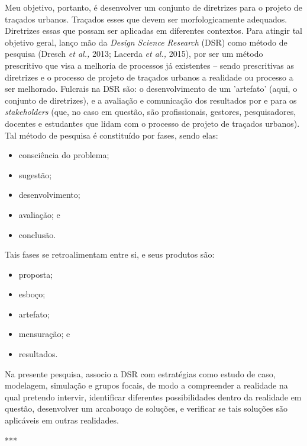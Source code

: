 \documentclass[]{report}
\begin{document}
	Meu objetivo, portanto, é desenvolver um conjunto de diretrizes para o projeto de traçados urbanos. Traçados esses que devem ser morfologicamente adequados. Diretrizes essas que possam ser aplicadas em diferentes contextos. Para atingir tal objetivo geral, lanço mão da \textit{Design Science Research} (DSR) como método de pesquisa (Dresch \textit{et al.,} 2013; Lacerda \textit{et al.,} 2015), por ser um método prescritivo que visa a melhoria de processos já existentes – sendo prescritivas as diretrizes e o processo de projeto de traçados urbanos a realidade ou processo a ser melhorado. Fulcrais na DSR são: o desenvolvimento de um 'artefato' (aqui, o conjunto de diretrizes), e a avaliação e comunicação dos resultados por e para os \textit{stakeholders} (que, no caso em questão, são profissionais, gestores, pesquisadores, docentes e estudantes que lidam com o processo de projeto de traçados urbanos). Tal método de pesquisa é constituído por fases, sendo elas: 
	\begin{itemize}
		\item consciência do problema;
		\item sugestão;
		\item desenvolvimento;
		\item avaliação; e
		\item conclusão.
	\end{itemize}
	Tais fases se retroalimentam entre si, e seus produtos são:
	\begin{itemize}
		\item proposta;
		\item esboço;
		\item artefato;
		\item mensuração; e
		\item resultados.
	\end{itemize}
	Na presente pesquisa, associo a DSR com estratégias como estudo de caso, modelagem, simulação e grupos focais, de modo a compreender a realidade na qual pretendo intervir, identificar diferentes possibilidades dentro da realidade em questão, desenvolver um arcabouço de soluções, e verificar se tais soluções são aplicáveis em outras realidades.



	***
\end{document}
